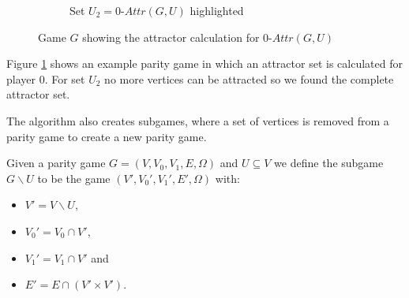 \begin{figure}
\begin{subfigure}{1\textwidth}
		\caption{Set $U_2 = 0\textit{-Attr}(G,U)$ highlighted}
	\end{subfigure}
	\caption{Game $G$ showing the attractor calculation for $0\textit{-Attr}(G,U)$}
	\label{fig:AttrCalcExample}
\end{figure}
\begin{example}
	Figure \ref{fig:AttrCalcExample} shows an example parity game in which an attractor set is calculated for player $0$. For set $U_2$ no more vertices can be attracted so we found the complete attractor set.
\end{example}

The algorithm also creates subgames, where a set of vertices is removed from a parity game to create a new parity game.

\begin{definition}
	\label{def_org_subgame}
	Given a parity game $G = (V,V_0,V_1, E,\Omega)$ and $U \subseteq V$ we define the subgame $G \backslash U$ to be the game $(V', V_0', V_1', E', \Omega)$ with:
	\begin{itemize}
		\item $V' = V \backslash U$,
		\item $V_0' = V_0 \cap V'$,
		\item $V_1' = V_1 \cap V'$ and
		\item $E' = E \cap (V' \times V')$.
	\end{itemize}
\end{definition}

